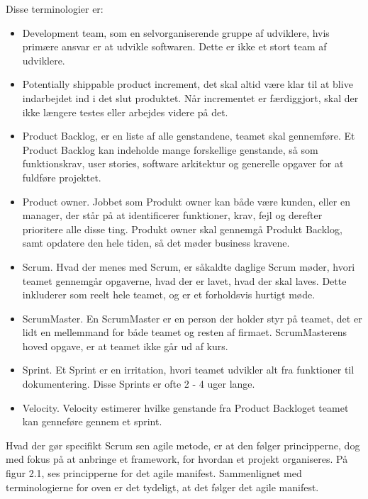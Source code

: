 Disse terminologier er\cite{Sommerville}: 
\begin{itemize}
    \item Development team, som en selvorganiserende gruppe af udviklere, hvis primære ansvar er at udvikle softwaren. Dette er ikke et stort team af udviklere. 
    
    \item Potentially shippable product increment, det skal altid være klar til at blive indarbejdet ind i det slut produktet. Når incrementet er færdiggjort, skal der ikke længere testes eller arbejdes videre på det.
    
    \item Product Backlog, er en liste af alle genstandene, teamet skal gennemføre. Et Product Backlog kan indeholde mange forskellige genstande, så som funktionskrav, user stories, software arkitektur og generelle opgaver for at fuldføre projektet. 

    
    \item Product owner. Jobbet som Produkt owner kan både være kunden, eller en manager, der står på at identificerer funktioner, krav, fejl og derefter prioritere alle disse ting. Produkt owner skal gennemgå Produkt Backlog, samt opdatere den hele tiden, så det møder business kravene. 
    
    \item Scrum. Hvad der menes med Scrum, er såkaldte daglige Scrum møder, hvori teamet gennemgår opgaverne, hvad der er lavet, hvad der skal laves. Dette inkluderer som reelt hele teamet, og er et forholdsvis hurtigt møde. 
    
    \item ScrumMaster. En ScrumMaster er en person der holder styr på teamet, det er lidt en mellemmand for både teamet og resten af firmaet. ScrumMasterens hoved opgave, er at teamet ikke går ud af kurs. 
    
    \item Sprint. Et Sprint er en irritation, hvori teamet udvikler alt fra funktioner til dokumentering. Disse Sprints er ofte 2 - 4 uger lange. 
    
    \item Velocity. Velocity estimerer hvilke genstande fra Product Backloget teamet kan genneføre gennem et sprint.
\end{itemize}

Hvad der gør specifikt Scrum sen agile metode, er at den følger principperne, dog med fokus på at anbringe et framework, for hvordan et projekt organiseres. På figur 2.1, ses principperne for det agile manifest. Sammenlignet med terminologierne for oven er det tydeligt, at det følger det agile manifest.\cite{Sommerville}  
 


